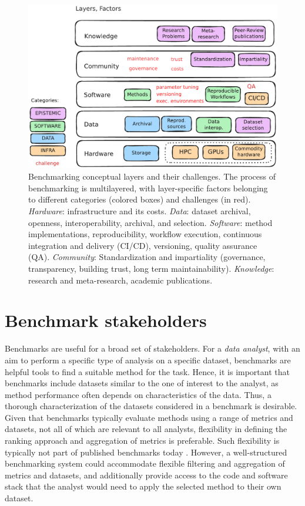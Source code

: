 \documentclass[11pt]{article}
\begin{document}
\begin{figure}
    \centering
    \includegraphics[width=0.8\linewidth]{../original_submission/figures/bens_layers.pdf}
    \caption[Benchmarking conceptual layers and their challenges.]{Benchmarking conceptual layers and their challenges. The process of benchmarking is multilayered, with layer-specific factors belonging to different categories (colored boxes) and challenges (in red). \emph{Hardware}: infrastructure and its costs. \emph{Data}: dataset archival, openness, interoperability, archival, and selection.  \emph{Software}: method implementations, reproducibility, workflow execution, continuous integration and delivery (CI/CD), versioning, quality assurance (QA). \emph{Community}: Standardization and impartiality (governance, transparency, building trust, long term maintainability). \emph{Knowledge}: research and meta-research, academic publications.}
    \label{fig:layers}
\end{figure}

\section*{Benchmark stakeholders}

Benchmarks are useful for a broad set of stakeholders. For a \emph{data analyst}, with an aim to perform a specific type of analysis on a specific dataset, benchmarks are helpful tools to find a suitable method for the task. Hence, it is important that benchmarks include datasets similar to the one of interest to the analyst, as method performance often depends on characteristics of the data. Thus, a thorough characterization of the datasets considered in a benchmark is desirable. Given that benchmarks typically evaluate methods using a range of metrics and datasets, not all of which are relevant to all analysts, flexibility in defining the ranking approach and aggregation of metrics is preferable. Such flexibility is typically not part of published benchmarks today \cite{Sonrel2023-te}. However, a well-structured benchmarking system could accommodate flexible filtering and aggregation of metrics and datasets, and additionally provide access to the code and software stack that the analyst would need to apply the selected method to their own dataset. 
\end{document}
